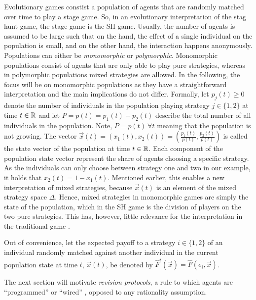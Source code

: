 \label{sec:evolutionarystaghunt}
Evolutionary games constist a population of agents that are randomly matched 
over time to play a stage game. So, in an evolutionary interpretation of the 
stag hunt game, the stage game is the SH game. 
Usually, the number of agents is assumed to be large such that on the hand, 
the effect of a single individual on the population is small, and on the
other hand, the interaction happens anonymously.
Populations can either be \textit{monomorphic} or \textit{polymorphic}.
Monomorphic populations consist of agents that are only able to play pure
strategies, whereas in polymorphic populations mixed strategies are allowed.
In the following, the focus will be on monomorphic populations as they have
a straightforward interpretation and the main implications do not differ. 
Formally, let $p_j(t) \geq 0$ denote the number of individuals in 
the population playing strategy $j \in \{1,2\}$ at time $t \in \mathbb{R}$ and 
let $P = p(t) = p_1(t) + p_2(t)$ describe the total number of all individuals 
in the population. Note, $P =p(t)\ \forall t$ meaning that the population 
is not growing. The vector $\vec{x}(t) = \left(x_1(t),x_2(t)\right)
=\left(\frac{p_1(t)}{p(t)},\frac{p_2(t)}{p(t)}\right)$ is called the state 
vector of the population at time $t \in \mathbb{R}$. 
Each component of the population state vector represent the share of agents 
choosing a specific strategy. As the individuals can only choose between 
strategy one and two in our example, it holds that  $x_2(t) = 1-x_1(t)$. 
Mentioned earlier, this enables a new interpretation of mixed strategies,
because $\vec{x}(t)$ is an element of the mixed strategy space $\Delta$.
Hence, mixed strategies in monomorphic games are simply the state
of the population, which in the SH game is the division of players on the two
pure strategies. This has, however, little relevance for the interpretation
in the traditional game \parencite[914-915]{rubinstein_comments_1991}.

Out of convenience, let the expected payoff 
to a strategy $i \in \{1,2\}$ of an individual randomly matched
against another individual in the current population state at time $t$, 
$\vec{x}(t)$, be denoted by $\hat{F}^i(\vec{x}) = \hat{F}(e_i,\vec{x})$. 

The next section will motivate \textit{revision protocols}, a rule to
which agents are ``programmed'' or ``wired'' \parencite{gintis_game_2000}, 
opposed to any rationality assumption. 
